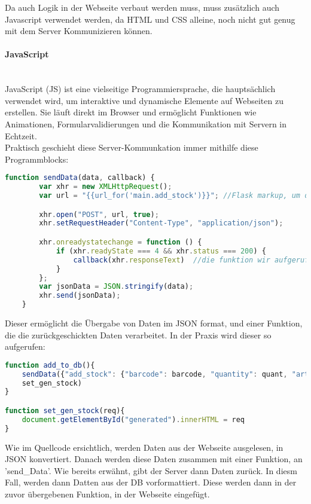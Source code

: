 Da auch Logik in der Webseite verbaut werden muss, muss zusätzlich auch Javascript verwendet werden, da HTML und CSS alleine, noch nicht gut genug mit dem Server Kommunizieren können.

\paragraph{JavaScript}\mbox{}\\
JavaScript (JS) ist eine vielseitige Programmiersprache, die hauptsächlich verwendet wird, um interaktive und dynamische Elemente auf Webseiten zu erstellen. Sie läuft direkt im Browser und ermöglicht Funktionen wie Animationen, Formularvalidierungen und die Kommunikation mit Servern in Echtzeit.\cite{chatgpt}\\

Praktisch geschieht diese Server-Kommunkation immer mithilfe diese Programmblocks:

\begin{lstlisting}[language=JavaScript]
    function sendData(data, callback) {
        var xhr = new XMLHttpRequest();
        var url = "{{url_for('main.add_stock')}}"; //Flask markup, um die richtige url zu erreichen, dies wird vor ausgabe auf der Webseite noch eingesetzt

        xhr.open("POST", url, true);
        xhr.setRequestHeader("Content-Type", "application/json");

        xhr.onreadystatechange = function () {
            if (xhr.readyState === 4 && xhr.status === 200) {
                callback(xhr.responseText)  //die funktion wir aufgerufen
            }
        };
        var jsonData = JSON.stringify(data);
        xhr.send(jsonData);
    }
\end{lstlisting}

Dieser ermöglicht die Übergabe von Daten im JSON format, und einer Funktion, die die zurückgeschickten Daten verarbeitet. In der Praxis wird dieser so aufgerufen:

\begin{lstlisting}[language=JavaScript]
function add_to_db(){
    sendData({"add_stock": {"barcode": barcode, "quantity": quant, "article": article}}, 
    set_gen_stock)
}

function set_gen_stock(req){
    document.getElementById("generated").innerHTML = req
}\end{lstlisting}

Wie im Quellcode ersichtlich, werden Daten aus der Webseite ausgelesen, in JSON konvertiert. Danach werden diese Daten zusammen mit einer Funktion, an 'send\_Data'. Wie bereits erwähnt, gibt der Server dann Daten zurück. In diesm Fall, werden dann Datten aus der DB vorformattiert. Diese werden dann in der zuvor übergebenen Funktion, in der Webseite eingefügt.

